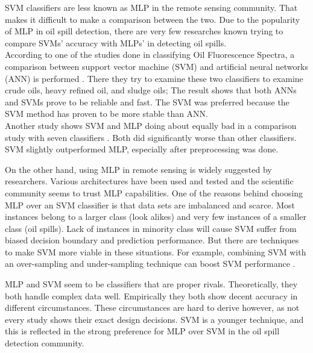 SVM classifiers are less known as MLP in the remote sensing community. That makes it difficult to make a comparison between the two. Due to the popularity of MLP in oil spill detection, there are very few researches known trying to compare SVMs' accuracy with MLPs' in detecting oil spills.\\ 

According to one of the studies done in classifying Oil Fluorescence Spectra, a comparison between support vector machine (SVM) and artificial neural networks (ANN) is performed \cite{almhdi2007classification}. There they try to examine these two classifiers to examine crude oils, heavy refined oil, and sludge oils; The result shows that both ANNs and SVMs prove to be reliable and fast. The SVM was preferred because the SVM method has proven to be more stable than ANN.\\

Another study shows SVM and MLP doing about equally bad in a comparison study with seven classifiers \cite{Xu201414}. Both did significantly worse than other classifiers. SVM slightly outperformed MLP, especially after preprocessing was done. 

On the other hand, using MLP in remote sensing is widely suggested by researchers\cite{Mera201472,Brekke200595,fingas2014review}. Various architectures have been used and tested and the scientific community seems to trust MLP capabilities. One of the reasons behind choosing MLP over an SVM classifier is that data sets are imbalanced and scarce. Most instances belong to a larger class (look alikes) and very few instances of a smaller class (oil spills). Lack of instances in minority class will cause SVM suffer from biased decision boundary and prediction performance. But there are techniques to make SVM more viable in these situations. For example, combining SVM with an over-sampling and under-sampling technique can boost SVM performance \cite{liu2006boosting}.

MLP and SVM seem to be classifiers that are proper rivals. Theoretically, they both handle complex data well. Empirically they both show decent accuracy in different circumstances. These circumstances are hard to derive however, as not every study shows their exact design decisions. SVM is a younger technique, and this is reflected in the strong preference for MLP over SVM in the oil spill detection community. 